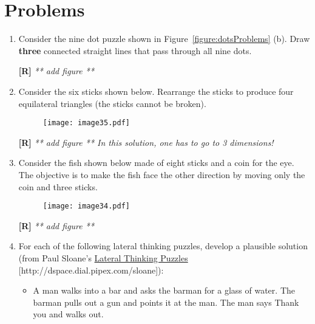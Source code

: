\section{Problems}
\label{section:conceptGenProblems}

\begin{enumerate}
\def\labelenumi{\arabic{enumi}.}
\item
  Consider the nine dot puzzle shown in Figure~\ref{figure:dotsProblems} (b). Draw
  \textbf{three} connected straight lines that pass through all nine
  dots.
  \begin{onlysolution}
  \textbf{[R]}
  \itshape
    ** add figure **
  \end{onlysolution}

\item
  Consider the six sticks shown below. Rearrange the sticks to produce
  four equilat­eral triangles (the sticks cannot be broken).
  
  \begin{figure}[h]
  \texttt{[image: image35.pdf]}
  \label{figure:sixSticks}
  \end{figure}

  \begin{onlysolution}
  \textbf{[R]}
  \itshape
    ** add figure **
  In this solution, one has to go to 3 dimensions!
  \end{onlysolution}

\item
  Consider the fish shown below made of eight sticks and a coin for the
  eye. The objective is to make the fish face the other direction by
  moving only the coin and three sticks.

  \begin{figure}[h]
  \texttt{[image: image34.pdf]}
  \label{figure:fishStickFigure}
  \end{figure}

  \begin{onlysolution}
  \textbf{[R]}
  \itshape
    ** add figure **
  \end{onlysolution}

\item
  For each of the following lateral thinking puzzles, develop a
  plausible solution (from Paul Sloane's \ul{Lateral Thinking Puzzles}
  {[}http://dspace.dial.pipex.com/sloane{]}):

\begin{itemize}
\item
  A man walks into a bar and asks the barman for a glass of water. The
  barman pulls out a gun and points it at the man. The man says
  \textquotesingle Thank you\textquotesingle{} and walks out.


\end{itemize}
\end{enumerate}
